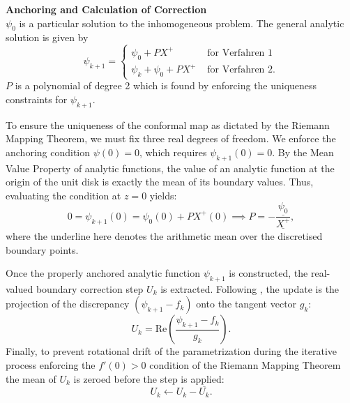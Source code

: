 \bigskip\noindent\textbf{Anchoring and Calculation of Correction}\\
$\psi_0$ is a particular solution to the inhomogeneous problem. The general analytic solution is given by \cite[Eq. 3.9]{Wegmann1978_newtonverfahren}
\begin{equation}
    \psi_{k+1} = 
    \begin{cases}
        \psi_0 + P X^+ & \text{ for Verfahren 1} \\
        \psi_k + \psi_0 + P X^+ & \text{ for Verfahren 2}.
    \end{cases}
\end{equation}
$P$ is a polynomial of degree 2 which is found by enforcing the uniqueness constraints for $\psi_{k+1}$.

To ensure the uniqueness of the conformal map as dictated by the Riemann Mapping Theorem, we must fix three real degrees of freedom. 
We enforce the anchoring condition $\psi(0) = 0$, which requires $\psi_{k+1}(0) = 0$. 
By the Mean Value Property \cite[Eq. 14.2-2]{Henrici1986_vol3} of analytic functions, the value of an analytic function at the origin of the unit disk is exactly the mean of its boundary values. Thus, evaluating the condition at $z=0$ yields:
\begin{equation} \label{eq:initcond_1}
    0 = \psi_{k+1}(0) = \psi_0(0) + P X^+(0) \implies P = -\frac{\underline{\psi_0}}{\underline{X^+}},
\end{equation}
where the underline here denotes the arithmetic mean over the discretised boundary points.

Once the properly anchored analytic function $\psi_{k+1}$ is constructed, the real-valued boundary correction step $U_k$ is extracted. Following \cite[Eq. 2.4]{Wegmann1978_newtonverfahren}, the update is the projection of the discrepancy $(\psi_{k+1} - f_k)$ onto the tangent vector $g_k$:
\begin{equation}
    U_k = \text{Re}\left( \frac{\psi_{k+1} - f_k}{g_k} \right).
\end{equation}
Finally, to prevent rotational drift of the parametrization during the iterative process enforcing the $f'(0) > 0$ condition of the Riemann Mapping Theorem the mean of $U_k$ is zeroed before the step is applied:
\begin{equation}\label{eq:initcond_2}
    U_k \leftarrow U_k - \overline{U_k}.
\end{equation}

